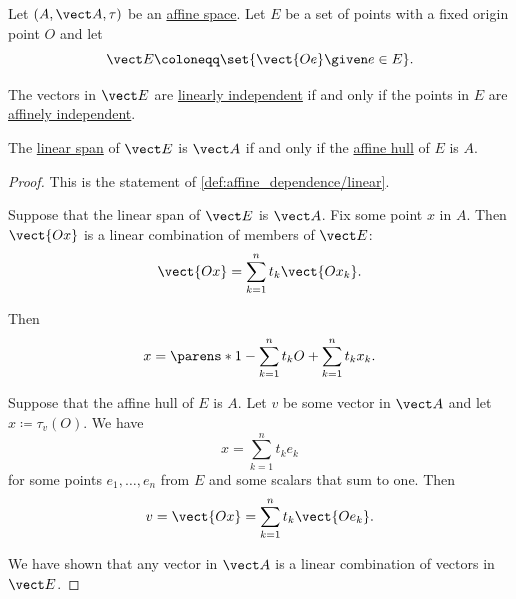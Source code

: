 \begin{proposition}\label{thm:linear_and_affine_bases}
  Let \( (A, \vect A, \tau) \) be an \hyperref[def:affine_space]{affine space}. Let \( E \) be a set of points with a fixed origin point \( O \) and let
  \begin{equation*}
    \vect E \coloneqq \set{ \vect{Oe} \given e \in E }.
  \end{equation*}

  \begin{thmenum}
     The vectors in \( \vect E \) are \hyperref[def:linear_dependence]{linearly independent} if and only if the points in \( E \) are \hyperref[def:affine_dependence]{affinely independent}.

     The \hyperref[def:semimodule/subobject]{linear span} of \( \vect E \) is \( \vect A \) if and only if the \hyperref[def:affine_hull]{affine hull} of \( E \) is \( A \).
  \end{thmenum}
\end{proposition}
\begin{proof}
   This is the statement of \cref{def:affine_dependence/linear}.

  \SufficiencySubProof* Suppose that the linear span of \( \vect E \) is \( \vect A \). Fix some point \( x \) in \( A \). Then \( \vect{Ox} \) is a linear combination of members of \( \vect E \):
  \begin{equation*}
    \vect{Ox} = \sum_{k=1}^n t_k \vect{O x_k}.
  \end{equation*}

  Then
  \begin{equation*}
    x = \parens*{ 1 - \sum_{k=1}^n t_k } O + \sum_{k=1}^n t_k x_k.
  \end{equation*}

  \NecessitySubProof* Suppose that the affine hull of \( E \) is \( A \). Let \( v \) be some vector in \( \vect A \) and let \( x \coloneqq \tau_v(O) \). We have
  \begin{equation*}
    x = \sum_{k=1}^n t_k e_k
  \end{equation*}
  for some points \( e_1, \ldots, e_n \) from \( E \) and some scalars that sum to one. Then
  \begin{equation*}
    v = \vect{Ox} = \sum_{k=1}^n t_k \vect{O e_k}.
  \end{equation*}

  We have shown that any vector in \( \vect A \) is a linear combination of vectors in \( \vect E \).
\end{proof}


